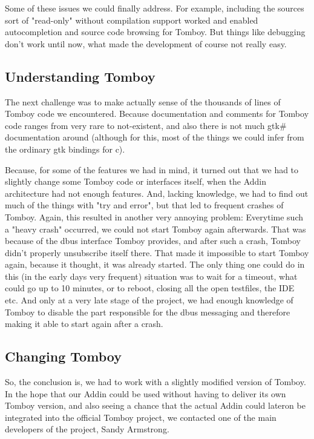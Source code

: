 \documentclass[11pt,a4paper,titlepage]{article}
\begin{document}
Some of these issues we could finally address. For example, including the sources sort of "read-only" without compilation support worked and enabled autocompletion and source code browsing for Tomboy. But things like debugging don't work until now, what made the development of course not really easy.

\subsection{Understanding Tomboy}
The next challenge was to make actually sense of the thousands of lines of Tomboy code we encountered. Because documentation and comments for Tomboy code ranges from very rare to not-existent, and also there is not much gtk\# documentation around (although for this, most of the things we could infer from the ordinary gtk bindings for c).

Because, for some of the features we had in mind, it turned out that we had to slightly change some Tomboy code or interfaces itself, when the Addin architecture had not enough features. And, lacking knowledge, we had to find out much of the things with "try and error", but that led to frequent crashes of Tomboy. Again, this resulted in another very annoying problem: Everytime such a "heavy crash" occurred, we could not start Tomboy again afterwards. That was because of the dbus interface Tomboy provides, and after such a crash, Tomboy didn't properly unsubscribe itself there. That made it impossible to start Tomboy again, because it thought, it was already started. The only thing one could do in this (in the early days very frequent) situation was to wait for a timeout, what could go up to 10 minutes, or to reboot, closing all the open testfiles, the IDE etc. And only at a very late stage of the project, we had enough knowledge of Tomboy to disable the part responsible for the dbus messaging and therefore making it able to start again after a crash.

\subsection{Changing Tomboy}
So, the conclusion is, we had to work with a slightly modified version of Tomboy. In the hope that our Addin could be used without having to deliver its own Tomboy version, and also seeing a chance that the actual Addin could lateron be integrated into the official Tomboy project, we contacted one of the main developers of the project, Sandy Armstrong.
\end{document}
